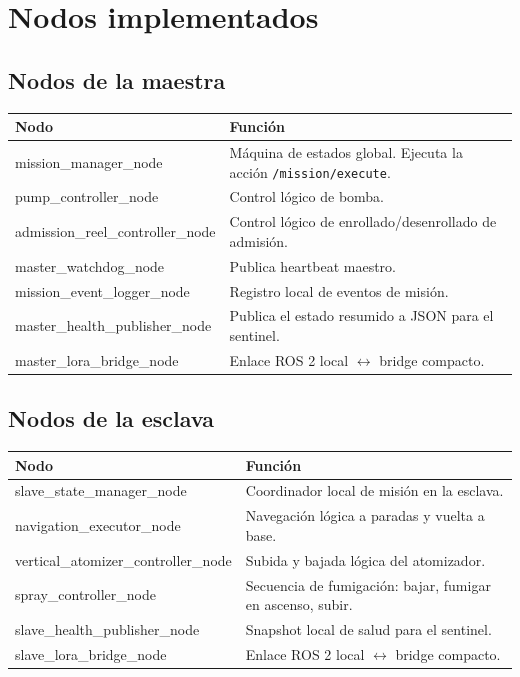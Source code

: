 \documentclass[11pt,a4paper]{article}
\begin{document}
\section{Nodos implementados}
\subsection{Nodos de la maestra}
\begin{center}
\begin{tabularx}{\textwidth}{>{\ttfamily}l X}
\toprule
Nodo & Funci\'on \\
\midrule
mission\_manager\_node & M\'aquina de estados global. Ejecuta la acci\'on \texttt{/mission/execute}. \\
pump\_controller\_node & Control l\'ogico de bomba. \\
admission\_reel\_controller\_node & Control l\'ogico de enrollado/desenrollado de admisi\'on. \\
master\_watchdog\_node & Publica heartbeat maestro. \\
mission\_event\_logger\_node & Registro local de eventos de misi\'on. \\
master\_health\_publisher\_node & Publica el estado resumido a JSON para el sentinel. \\
master\_lora\_bridge\_node & Enlace ROS 2 local $\leftrightarrow$ bridge compacto. \\
\bottomrule
\end{tabularx}
\end{center}

\subsection{Nodos de la esclava}
\begin{center}
\begin{tabularx}{\textwidth}{>{\ttfamily}l X}
\toprule
Nodo & Funci\'on \\
\midrule
slave\_state\_manager\_node & Coordinador local de misi\'on en la esclava. \\
navigation\_executor\_node & Navegaci\'on l\'ogica a paradas y vuelta a base. \\
vertical\_atomizer\_controller\_node & Subida y bajada l\'ogica del atomizador. \\
spray\_controller\_node & Secuencia de fumigaci\'on: bajar, fumigar en ascenso, subir. \\
slave\_health\_publisher\_node & Snapshot local de salud para el sentinel. \\
slave\_lora\_bridge\_node & Enlace ROS 2 local $\leftrightarrow$ bridge compacto. \\
\bottomrule
\end{tabularx}
\end{center}
\end{document}
